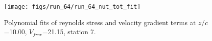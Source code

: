 \begin{figure}[H]
\centering
\texttt{[image: figs/run\_64/run\_64\_nut\_tot\_fit]}
\caption{Polynomial fits of reynolds stress and velocity gradient terms at $z/c$=10.00, $V_{free}$=21.15, station 7.}
\label{fig:run_64_nut_tot_fit}
\end{figure}


